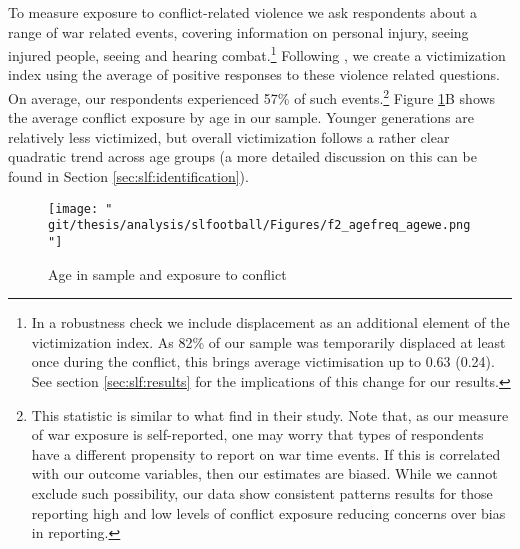 To measure exposure to conflict-related violence we ask respondents about a range of war related events, covering information on personal injury, seeing injured people, seeing and hearing combat.\footnote{In a robustness check we include displacement as an additional element of the victimization index. As 82\% of our sample was temporarily displaced at least once during the conflict, this brings average victimisation up to 0.63 (0.24). See section \ref{sec:slf:results} for the implications of this change for our results.} Following \cite{Bellows2009b}, we create a victimization index using the average of positive responses to these violence related questions. On average, our respondents experienced 57\% of such events.\footnote{This statistic is similar to what \citet{Bellows2009b} find in their study. Note that, as our measure of war exposure is self-reported, one may worry that types of respondents have a different propensity to report on war time events. If this is correlated with our outcome variables, then our estimates are biased. While we cannot exclude such possibility, our data show consistent patterns results for those reporting high and low levels of conflict exposure reducing concerns over bias in reporting.}  Figure \ref{fig:slf:ageconflict}B shows the average conflict exposure by age in our sample. Younger generations are relatively less victimized, but overall victimization follows a rather clear quadratic trend across age groups (a more detailed discussion on this can be found in Section \ref{sec:slf:identification}).

\begin{figure}[htb]
  \texttt{[image: "\\git/thesis/analysis/slfootball/Figures/f2\_agefreq\_agewe.png"]}
  \caption{Age in sample and exposure to conflict}
  \label{fig:slf:ageconflict}
\end{figure}

